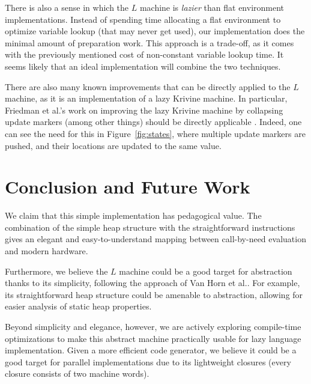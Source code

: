 \documentclass[preprint]{sigplanconf}
\begin{document}
There is also a sense in which the $L$ machine is \emph{lazier} than flat
environment implementations. Instead of spending time allocating a flat
environment to optimize variable lookup (that may never get used), our
implementation does the minimal amount of preparation work. This approach is a
trade-off, as it comes with the previously mentioned cost of non-constant
variable lookup time. It seems likely that an ideal implementation will combine
the two techniques. 

There are also many known improvements that can be directly applied to the $L$
machine, as it is an implementation of a lazy Krivine machine. In particular,
Friedman et al.'s work on improving the lazy Krivine machine by collapsing
update markers (among other things) should be directly applicable \cite{lkm}.
Indeed, one can see the need for this in Figure~\ref{fig:states}, where multiple
update markers are pushed, and their locations are updated to the same value.

\section{Conclusion and Future Work}
We claim that this simple implementation has pedagogical value. The combination
of the simple heap structure with the straightforward instructions gives an
elegant and easy-to-understand mapping between call-by-need evaluation and
modern hardware.

Furthermore, we believe the $L$ machine could be a good target for abstraction
thanks to its simplicity, following the approach of Van Horn et
al.\cite{van2010abstracting}. For example, its straightforward heap structure
could be amenable to abstraction, allowing for easier analysis of static heap
properties.

Beyond simplicity and elegance, however, we are actively exploring compile-time
optimizations to make this abstract machine practically usable for lazy language
implementation. Given a more efficient code generator, we believe it could be a
good target for parallel implementations due to its lightweight closures (every
closure consists of two machine words).



\end{document}
